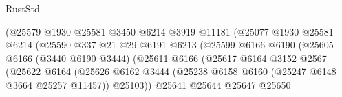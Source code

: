 \begin{lexlean}{RustStd}
\begin{coremodule}
                                            (@25579
                                              @1930
                                              @25581
                                              @3450
                                              @6214
                                              @3919
                                              @11181
                                              (@25077
                                                @1930
                                                @25581
                                                @6214
                                                (@25590
                                                  @337
                                                  @21
                                                  @29
                                                  @6191
                                                  @6213
                                                  (@25599
                                                    @6166
                                                    @6190
                                                    (@25605
                                                      @6166
                                                      (@3440 @6190 @3444)
                                                      (@25611
                                                        @6166
                                                        (@25617
                                                          @6164
                                                          @3152
                                                          @2567
                                                          (@25622
                                                            @6164
                                                            (@25626
                                                              @6162
                                                              @3444
                                                              (@25238
                                                                @6158
                                                                @6160
                                                                (@25247 @6148 @3664 @25257 @11457))
                                                              @25103))
                                                          @25641
                                                          @25644
                                                          @25647
                                                          @25650

\end{coremodule}
\end{lexlean}
